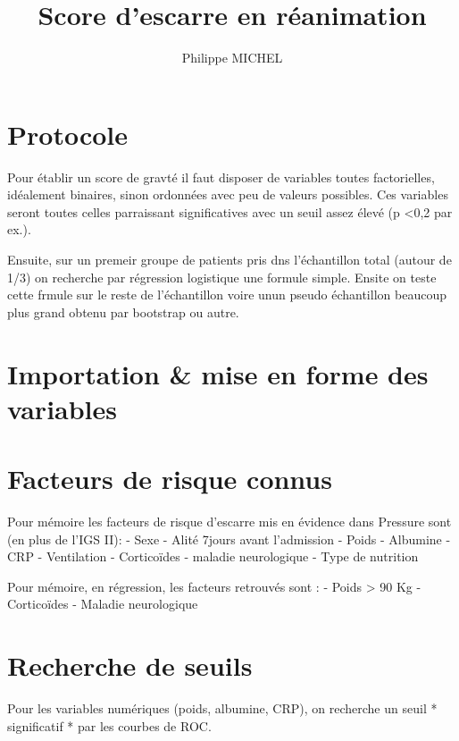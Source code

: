 \documentclass[a4paper, french]{article}
\title{Score d'escarre en réanimation}
\author{Philippe MICHEL}
\begin{document}
\maketitle

\tableofcontents

\hypertarget{protocole}{%
\section{Protocole}\label{protocole}}

Pour établir un score de gravté il faut disposer de variables toutes
factorielles, idéalement binaires, sinon ordonnées avec peu de valeurs
possibles. Ces variables seront toutes celles parraissant significatives
avec un seuil assez élevé (p \textless{}0,2 par ex.).

Ensuite, sur un premeir groupe de patients pris dns l'échantillon total
 (autour de 1/3) on recherche par régression logistique une formule
simple. Ensite on teste cette frmule sur le reste de l'échantillon voire
unun pseudo échantillon beaucoup plus grand obtenu par bootstrap ou
autre.

\hypertarget{importation-mise-en-forme-des-variables}{%
\section{Importation \& mise en forme des
variables}\label{importation-mise-en-forme-des-variables}}

\hypertarget{facteurs-de-risque-connus}{%
\section{Facteurs de risque connus}\label{facteurs-de-risque-connus}}

Pour mémoire les facteurs de risque d'escarre mis en évidence dans
Pressure sont (en plus de l'IGS II): - Sexe - Alité 7jours avant
l'admission - Poids - Albumine - CRP - Ventilation - Corticoïdes -
maladie neurologique - Type de nutrition

Pour mémoire, en régression, les facteurs retrouvés sont : - Poids
\textgreater{} 90 Kg - Corticoïdes - Maladie neurologique

\hypertarget{recherche-de-seuils}{%
\section{Recherche de seuils}\label{recherche-de-seuils}}

Pour les variables numériques (poids, albumine, CRP), on recherche un
seuil * significatif * par les courbes de ROC.
\end{document}
